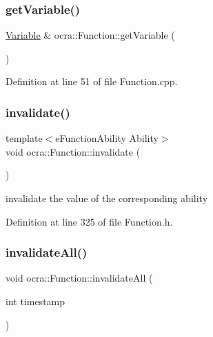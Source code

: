 \subsubsection{\texorpdfstring{get\+Variable()}{getVariable()}\hspace{0.1cm}{\footnotesize\ttfamily [2/2]}}
{\footnotesize\ttfamily \hyperlink{classocra_1_1Variable}{Variable} \& ocra\+::\+Function\+::get\+Variable (\begin{DoxyParamCaption}{ }\end{DoxyParamCaption})}



Definition at line 51 of file Function.\+cpp.

\hypertarget{classocra_1_1Function_aa66bc14ed8c17e88224fa2469d7d3a7e}{}\label{classocra_1_1Function_aa66bc14ed8c17e88224fa2469d7d3a7e} 
\subsubsection{\texorpdfstring{invalidate()}{invalidate()}}
{\footnotesize\ttfamily template$<$e\+Function\+Ability Ability$>$ \\
void ocra\+::\+Function\+::invalidate (\begin{DoxyParamCaption}{ }\end{DoxyParamCaption})\hspace{0.3cm}{\ttfamily [inline]}}

invalidate the value of the corresponding ability 

Definition at line 325 of file Function.\+h.

\hypertarget{classocra_1_1Function_ae33c94ee0c807b05869609f7a166ff82}{}\label{classocra_1_1Function_ae33c94ee0c807b05869609f7a166ff82} 
\subsubsection{\texorpdfstring{invalidate\+All()}{invalidateAll()}\hspace{0.1cm}{\footnotesize\ttfamily [1/2]}}
{\footnotesize\ttfamily void ocra\+::\+Function\+::invalidate\+All (\begin{DoxyParamCaption}\item[{int}]{timestamp }\end{DoxyParamCaption})\hspace{0.3cm}{\ttfamily [inline]}}

